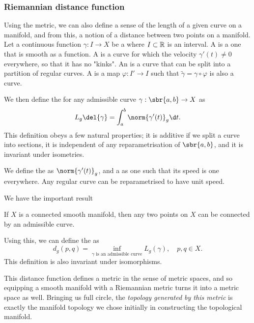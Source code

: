 \subsubsection{Riemannian distance function}
Using the metric, we can also define a sense of the length of a given curve on a manifold, and from this, a notion of a distance between two points on a manifold.
Let a continuous function \(\gamma: I \to X\) be a  where \(I \subset \mathbb{R}\) is an interval.
A  is a one that is smooth as a function.
A  is a curve for which the velocity \(\gamma'(t) \neq 0\) everywhere, so that it has no "kinks".
An  is a curve that can be split into a partition of regular curves.
A  is a map \(\varphi: I'\to I\) such that \(\tilde \gamma = \gamma \circ \varphi\) is also a curve.

We then define the  for any admissible curve \(\gamma: \sbr{a, b}\to X\)  as
\[L_g\del{\gamma} = \int_a^b \norm{\gamma'(t)}_g\d t.\]
This definition obeys a few natural properties; it is additive if we split a curve into sections, it is independent of any reparametrisation of \(\sbr{a,b}\), and it is invariant under isometries.

We define the  as \(\norm{\gamma'(t)}_g\), and a  as one such that its speed is one everywhere.
Any regular curve can be reparametrised to have unit speed.

We have the important result
\begin{proposition}
	If \(X\) is a connected smooth manifold, then any two points on \(X\) can be connected by an admissible curve.
\end{proposition}

Using this, we can define the  as
\[
	d_g(p, q) = \inf_{\gamma \text{ is an admissible curve}} L_g (\gamma), \quad p,q\in X
.\] This definition is also invariant under isomorphisms.

This distance function defines a metric in the sense of metric spaces, and so equipping a smooth manifold with a Riemannian metric turns it into a metric space as well.
Bringing us full circle, the \emph{topology generated by this metric} is exactly the manifold topology we chose initially in constructing the topological manifold.


